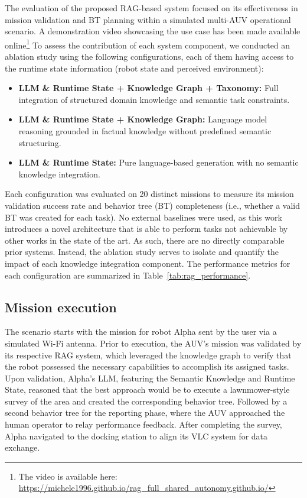 The evaluation of the proposed RAG-based system focused on its effectiveness in mission validation and BT planning within a simulated multi-AUV operational scenario. A demonstration video showcasing the use case has been made available online\footnote{The video is available here: \url{https://michele1996.github.io/rag_full_shared_autonomy.github.io/}}
To assess the contribution of each system component, we conducted an ablation study using the following configurations, each of them having access to the runtime state information (robot state and perceived environment):

\begin{itemize}
    \item \textbf{LLM \& Runtime State + Knowledge Graph + Taxonomy:} Full integration of structured domain knowledge and semantic task constraints.
    \item \textbf{LLM \& Runtime State + Knowledge Graph:} Language model reasoning grounded in factual knowledge without predefined semantic structuring.
    \item \textbf{LLM \& Runtime State:} Pure language-based generation with no semantic knowledge integration.
\end{itemize}

Each configuration was evaluated on 20 distinct missions to measure its mission validation success rate and behavior tree (BT) completeness (i.e., whether a valid BT was created for each task). 
No external baselines were used, as this work introduces a novel architecture that is able to perform tasks not achievable by other works in the state of the art. As such, there are no directly comparable prior systems. Instead, the ablation study serves to isolate and quantify the impact of each knowledge integration component.
The performance metrics for each configuration are summarized in Table~\ref{tab:rag_performance}.

\subsection{Mission execution} 
The scenario starts with the mission for robot Alpha sent by the user via a simulated Wi-Fi antenna.
Prior to execution, the AUV's mission was validated by its respective RAG system, which leveraged the knowledge graph to verify that the robot possessed the necessary capabilities to accomplish its assigned tasks. Upon validation, Alpha's LLM, featuring the Semantic Knowledge and Runtime State, reasoned that the best approach would be to execute a lawnmower-style survey of the area and created the corresponding behavior tree. Followed by a second behavior tree for the reporting phase, where the AUV approached the human operator to relay performance feedback. After completing the survey, Alpha navigated to the docking station to align its VLC system for data exchange.

